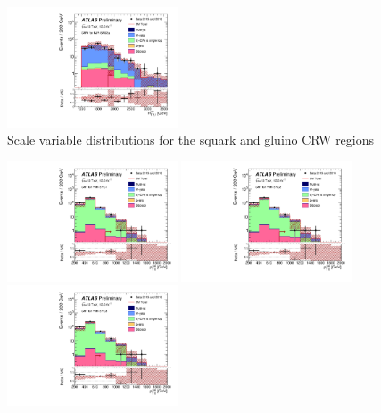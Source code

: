 \begin{figure}[tbp]
\begin{center}
\includegraphics[width=0.45\textwidth]{figures/ATLAS-CONF-2016-078_INT/N-1Plots/AtlasStyle/Preliminary/CRW_SRJigsawSRS3a_LastCut_CRW_minusone}
\end{center}
\caption{Scale variable distributions for the squark and gluino CRW regions}
\label{fig:CRW_SRJigsawSRG1a_LastCut_CRW_minusone}
\end{figure}

\begin{figure}[tbp]
\begin{center}
\includegraphics[width=0.45\textwidth]{figures/ATLAS-CONF-2016-078_INT/N-1Plots/AtlasStyle/Preliminary/CRT_SRJigsawSRC1_LastCut_CRT_minusone}
\includegraphics[width=0.45\textwidth]{figures/ATLAS-CONF-2016-078_INT/N-1Plots/AtlasStyle/Preliminary/CRT_SRJigsawSRC2_LastCut_CRT_minusone}
\includegraphics[width=0.45\textwidth]{figures/ATLAS-CONF-2016-078_INT/N-1Plots/AtlasStyle/Preliminary/CRT_SRJigsawSRC3_LastCut_CRT_minusone}

\end{center}
\end{figure}
